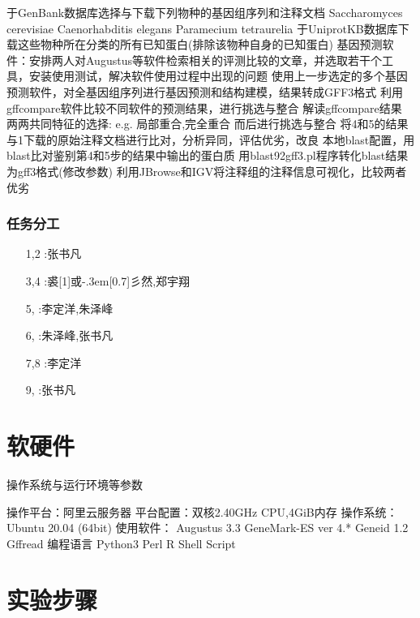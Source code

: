 \documentclass[12pt]{ctexart}
\newcommand{\yu}{\hbox{\scalebox{1}[1]{或}\kern-.3em\scalebox{0.3}[0.7]{彡}}}
\begin{document}
\begin{outline}[enumerate]
 \1 于GenBank数据库选择与下载下列物种的基因组序列和注释文档
   \2 Saccharomyces cerevisiae
   \2 Caenorhabditis elegans
   \2 Paramecium tetraurelia
 \1 于UniprotKB数据库下载这些物种所在分类的所有已知蛋白(排除该物种自身的已知蛋白)
 \1 基因预测软件：安排两人对Augustus等软件检索相关的评测比较的文章，并选取若干个工具，安装使用测试，解决软件使用过程中出现的问题
 \1 使用上一步选定的多个基因预测软件，对全基因组序列进行基因预测和结构建模，结果转成GFF3格式
 \1 利用gffcompare软件比较不同软件的预测结果，进行挑选与整合
    \2 解读gffcompare结果
    \2  两两共同特征的选择: e.g. 局部重合,完全重合
    \2 而后进行挑选与整合
 \1 将4和5的结果与1下载的原始注释文档进行比对，分析异同，评估优劣，改良
 \1 本地blast配置，用blast比对鉴别第4和5步的结果中输出的蛋白质
 \1 用blast92gff3.pl程序转化blast结果为gff3格式(修改参数)
 \1 利用JBrowse和IGV将注释组的注释信息可视化，比较两者优劣
\end{outline}
   
\subsubsection{任务分工}

\begin{itemize}
    \item [1,2]:张书凡
    \item [3,4]:裘\yu 然,郑宇翔
    \item [5,]:李定洋,朱泽峰
    \item [6,]:朱泽峰,张书凡
    \item [7,8]:李定洋
    \item [9,]:张书凡
\end{itemize}

\section{软硬件}

操作系统与运行环境等参数

\begin{outline}[enumerate]
\1 操作平台：阿里云服务器
\1 平台配置：双核2.40GHz CPU,4GiB内存
\1 操作系统：Ubuntu 20.04 (64bit)
\1 使用软件：
    \2 Augustus 3.3
    \2 GeneMark-ES ver 4.*
    \2 Geneid 1.2
    \2 Gffread
\1 编程语言
    \2 Python3
    \2 Perl
    \2 R
    \2 Shell Script
\end{outline}


\section{实验步骤}
\end{document}
